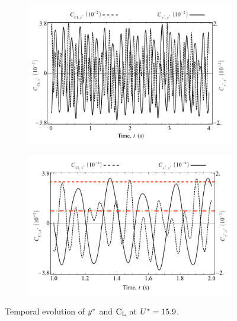 \documentclass[oneside]{utmthesis}
\begin{document}
\begin{figure}
  \centering
  \begin{subfigure}[h]{1\textwidth}
    \includegraphics[width=\textwidth]{figs/tempEvoCompare-a}
    \caption{}
    \label{fig:tempEvoCompare-a}
  \end{subfigure}

  \begin{subfigure}[h]{0.98\textwidth}
    \includegraphics[width=\textwidth]{figs/tempEvoCompare-b}
    \caption{}
    \label{fig:tempEvoCompare-b}
  \end{subfigure}
  \caption{Temporal evolution of $y^{*}$ and $\text{C}_{\text{L}}$ at $U^{*} = 15.9$.} \label{fig:tempEvoCompare}
\end{figure}
\end{document}

